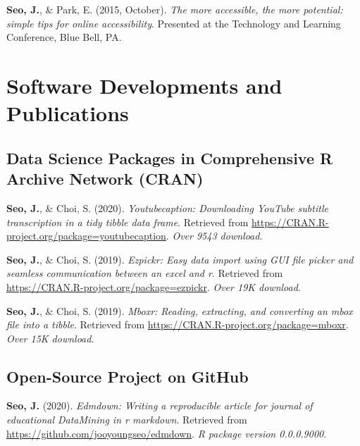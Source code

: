 \documentclass[11pt,a4paper,]{awesome-cv}
\begin{document}
\textbf{Seo, J.}, \& Park, E. (2015, October). \emph{The more
accessible, the more potential: simple tips for online accessibility}.
Presented at the Technology and Learning Conference, Blue Bell, PA.

\hypertarget{software-developments-and-publications}{%
\section{Software Developments and
Publications}\label{software-developments-and-publications}}

\hypertarget{data-science-packages-in-comprehensive-r-archive-network-cran}{%
\subsection{Data Science Packages in Comprehensive R Archive Network
(CRAN)}\label{data-science-packages-in-comprehensive-r-archive-network-cran}}

\hypertarget{refs_R_packages}{}
\leavevmode{}%
\textbf{Seo, J.}, \& Choi, S. (2020). \emph{Youtubecaption: Downloading
YouTube subtitle transcription in a tidy tibble data frame}. Retrieved
from \url{https://CRAN.R-project.org/package=youtubecaption}. \emph{Over
9543 download}.

\leavevmode{}%
\textbf{Seo, J.}, \& Choi, S. (2019). \emph{Ezpickr: Easy data import
using GUI file picker and seamless communication between an excel and
r}. Retrieved from \url{https://CRAN.R-project.org/package=ezpickr}.
\emph{Over 19K download}.

\leavevmode{}%
\textbf{Seo, J.}, \& Choi, S. (2019). \emph{Mboxr: Reading, extracting,
and converting an mbox file into a tibble}. Retrieved from
\url{https://CRAN.R-project.org/package=mboxr}. \emph{Over 15K
download}.

\newpage

\hypertarget{open-source-project-on-github}{%
\subsection{Open-Source Project on
GitHub}\label{open-source-project-on-github}}

\hypertarget{refs_github_projects}{}
\leavevmode{}%
\textbf{Seo, J.} (2020). \emph{Edmdown: Writing a reproducible article
for journal of educational DataMining in r markdown}. Retrieved from
\url{https://github.com/jooyoungseo/edmdown}. \emph{R package version
0.0.0.9000}.
\end{document}
